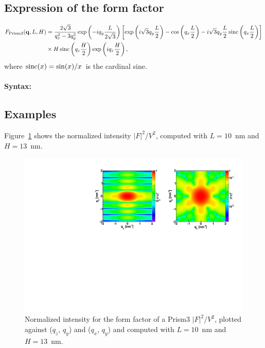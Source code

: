 \subsection{Expression of the form factor}
\begin{align*}
F_{\rm{Prism3}}(\mathbf{q},L, H) &= \frac{2 \sqrt{3}}{q_x^2-3q_y^2}  \exp\left(-i q_y\frac{L}{2\sqrt{3}}\right)\left[\exp\left(i \sqrt{3} q_y \frac{L}{2} \right)-\cos\left(q_x \frac{L}{2}\right)-i \sqrt{3} q_y \frac{L}{2} \operatorname{sinc}\left(q_x \frac{L}{2}\right) \right] \\
  &
\times  H \operatorname{sinc}\left(q_z \frac{H}{2} \right) \exp\left(i q_z \frac{H}{2}\right),
\end{align*}
where $\operatorname{sinc}(x)=\sin(x)/x$ is the cardinal sine.


\paragraph{Syntax:}  

\subsection{Examples}
Figure~\ref{fig:FFprism3Ex} shows the normalized intensity
$|F|^2/V^2$, computed with $L=10$~nm and \mbox{$H=13$~nm.}
\begin{figure}[h]
\begin{center}
\includegraphics[width=\textwidth]{Figures/figffprism3}
\end{center}
\caption{Normalized intensity for the form factor of a Prism3
  $|F|^2/V^2$, plotted against ($q_z$, $q_y$) and  ($q_x$, $q_y$) and
  computed with $L=10$~nm and $H=13$~nm.}
\label{fig:FFprism3Ex}
\end{figure}

